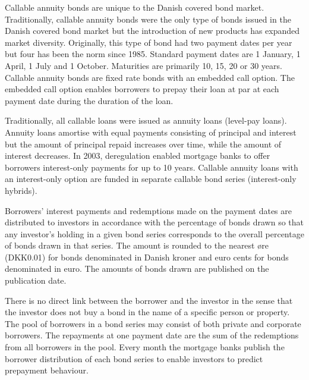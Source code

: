 \documentclass[12pt,twoside]{reedthesis}
\begin{document}
Callable annuity bonds are unique to the Danish covered bond market. Traditionally,
callable annuity bonds were the only type of bonds issued in the Danish covered bond market but the introduction of new products has expanded market diversity. Originally, this type of bond had two payment dates per year but four has been the norm since 1985. Standard payment dates are 1 January, 1 April, 1 July and 1 October. Maturities are primarily 10, 15, 20 or 30 years. Callable annuity bonds are fixed rate bonds with an embedded call option. The embedded call option enables borrowers to prepay their loan at par at each payment date during the duration of the loan.

Traditionally, all callable loans were issued as annuity loans (level-pay loans). Annuity loans amortise with equal payments consisting of principal and interest but the amount of principal repaid increases over time, while the amount of interest decreases. In 2003, deregulation enabled mortgage banks to offer borrowers interest-only payments for up to 10 years. Callable annuity loans with an interest-only option are funded in separate callable bond series (interest-only hybrids).

Borrowers' interest payments and redemptions made on the payment dates are distributed to investors in accordance with the percentage of bonds drawn so that any investor's holding in a given bond series corresponds to the overall percentage of bonds drawn in that series. The amount is rounded to the nearest øre (DKK0.01) for bonds denominated in Danish kroner and euro cents for bonds denominated in euro. The amounts of bonds drawn are published on the publication date.

There is no direct link between the borrower and the investor in the sense that the investor does not buy a bond in the name of a specific person or property. The pool of borrowers in a bond series may consist of both private and corporate borrowers. The repayments at one payment date are the sum of the redemptions from all borrowers in the pool. Every month the mortgage banks publish the borrower distribution of each bond series to enable investors to predict prepayment behaviour.
\end{document}

